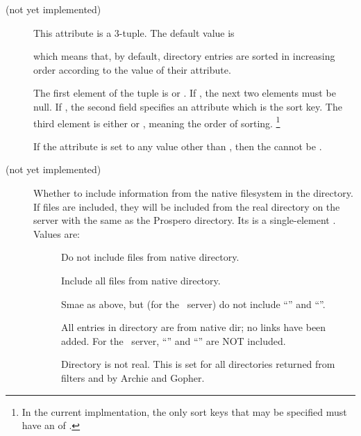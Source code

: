 \begin{description}
\item[ (not yet implemented)]  This attribute
is a 3-tuple.  The 
default value is 
\begin{command}
\end{command}
which means that, by default, directory entries are sorted in increasing
order according to the value of their 
attribute.

The first element of the tuple is  or .  If
, the next two elements must be null.  If ,
the second field specifies an attribute which is the sort key.  The
third element is either  or , meaning
the order of sorting.%
\footnote{In the current implmentation, the only sort keys
that may be specified must have an  of
.}

If the  attribute is set to any value other than
, then the  cannot be
.



\item[ (not yet implemented)] Whether to include
information from the native filesystem in the directory.  If files are
included, they will be included from the real directory on the server
with the same  as the Prospero directory.  Its
 is a single-element .  
Values are:
\begin{description}
\item[] Do not include files from native directory.
\item[]  Include all files from native directory.
\item[]	Smae as above, but (for the \unix\  server) do not
include ``'' and ``''.
\item[] All entries in directory are from native dir;
	no links have been added.  For the \unix\  server, ``'' and
``'' are NOT included. 
\item[] Directory is not real.  This is set for all
directories returned from filters and by Archie and Gopher.
\end{description}

\end{description}


